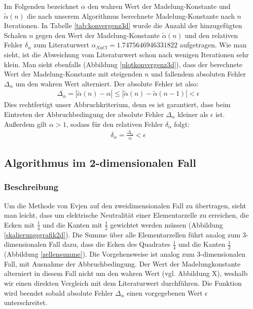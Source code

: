 \documentclass[10pt,a4paper]{article}
\begin{document}
Im Folgenden bezeichnet $\alpha$ den wahren Wert der Madelung-Konstante
und $\tilde{\alpha}(n)$ die nach unserem Algorithmus berechnete Madelung-Konstante
nach $n$ Iterationen.
In Tabelle \ref{tab:konvergenz3d} wurde die Anzahl der hinzugefügten Schalen $n$
gegen den Wert der Madelung-Konstante $\tilde{\alpha}(n)$ und den relativen Fehler $\delta_\alpha$ zum
Literaturwert $\alpha_{NaCl} = 1.7475646946331822$ \cite{Sakamoto} aufgetragen.
Wie man sieht, ist die Abweichung vom Literaturwert schon nach wenigen Iterationen
sehr klein.
Man sieht ebenfalls (Abbildung \ref{plotkonvergenz3d}), dass der berechnete Wert
der Madelung-Konstante mit steigenden $n$ und fallendem absoluten Fehler $\Delta_\alpha$ um
den wahren Wert alterniert. Der absolute Fehler ist also:
\begin{align}
	\Delta_\alpha = | \tilde{\alpha}(n) - \alpha | \leq | \tilde{\alpha}(n) - \tilde{\alpha}(n-1)| < \epsilon
\end{align}
Dies rechtfertigt unser Abbruchkriterium, denn es ist garantiert, dass beim Eintreten der
Abbruchbedingung der absolute Fehler $\Delta_\alpha$ kleiner als $\epsilon$ ist.
Außerdem gilt $\alpha > 1$, sodass für den relativen Fehler $\delta_\alpha$ folgt:
\begin{align}
	\delta_\alpha = \frac{\Delta_\alpha}{\alpha} < \epsilon
\end{align}

\subsection{Algorithmus im 2-dimensionalen Fall}
\subsubsection{Beschreibung}
Um die Methode von Evjen auf den zweidimensionalen Fall zu übertragen, sieht man leicht,
dass um elektrische Neutralität einer Elementarzelle zu erreichen, die Ecken mit $\frac{1}{4}$
und die Kanten mit $\frac{1}{2}$ gewichtet werden müssen (Abbildung \ref{skalierungsgrafik2d}).
Die Summe über alle Elementarzellen führt analog zum 3-dimensionalen Fall dazu, dass die Ecken
des Quadrates $\frac{1}{4}$ und die Kanten $\frac{1}{2}$ (Abbildung \ref{zellensumme}).
Die Vorgehensweise ist analog zum 3-dimensionalen Fall, mit Ausnahme der Abbruchbedingung.
Der Wert der Madelungkonstante alterniert in diesem Fall nicht um den wahren Wert (vgl. Abbildung X), weshalb
wir einen direkten Vergleich mit dem Literaturwert durchführen. Die Funktion wird beendet
sobald absolute Fehler $\Delta_\alpha$ einen vorgegebenen Wert $\epsilon$ unterschreitet.
\end{document}
